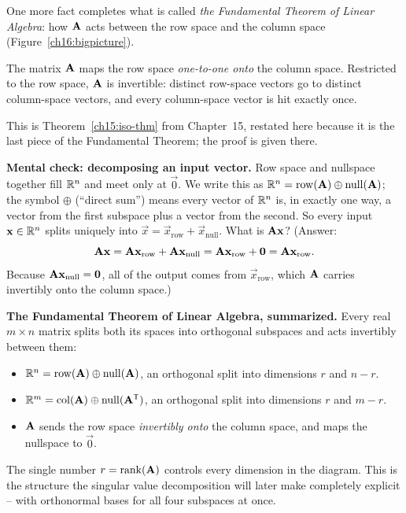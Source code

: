 One more fact completes what is called \emph{the Fundamental Theorem of Linear
Algebra}: how $\mathbf{A}$ acts between the row space and the column space
(Figure~\ref{ch16:bigpicture}).

\begin{theorem}\label{ch16:rowspace-iso}
The matrix $\mathbf{A}$ maps the row space \emph{one-to-one onto} the column space.
Restricted to the row space, $\mathbf{A}$ is invertible: distinct row-space vectors
go to distinct column-space vectors, and every column-space vector is hit exactly
once.
\end{theorem}

This is Theorem~\ref{ch15:iso-thm} from Chapter~15, restated here because it is
the last piece of the Fundamental Theorem; the proof is given there.

\begin{labbox}
\textbf{Mental check: decomposing an input vector.}
Row space and nullspace together fill $\mathbb{R}^n$ and meet only at $\vec{0}$. We write
this as $\mathbb{R}^n = \operatorname{row}(\mathbf{A}) \oplus \operatorname{null}(\mathbf{A})$; the symbol $\oplus$
(``direct sum'') means every vector of $\mathbb{R}^n$ is, in exactly one way, a vector
from the first subspace plus a vector from the second. So every input
$\mathbf{x}\in\mathbb{R}^n$ splits uniquely into $\vec{x} = \vec{x}_{\text{row}} + \vec{x}_{\text{null}}$.
What is $\mathbf{A}\mathbf{x}$?
(Answer:
\[
  \mathbf{A}\mathbf{x} = \mathbf{A}\mathbf{x}_{\text{row}} + \mathbf{A}\mathbf{x}_{\text{null}}
  = \mathbf{A}\mathbf{x}_{\text{row}} + \mathbf{0} = \mathbf{A}\mathbf{x}_{\text{row}}.
\]
Because
$\mathbf{A}\mathbf{x}_{\text{null}} = \mathbf{0}$, all of the output comes from
$\vec{x}_{\text{row}}$, which $\mathbf{A}$ carries invertibly onto the column space.)
\end{labbox}

\begin{focusbox}
\textbf{The Fundamental Theorem of Linear Algebra, summarized.} Every real
$m\times n$ matrix splits both its spaces into orthogonal subspaces and acts
invertibly between them:
\begin{itemize}
  \item $\mathbb{R}^n = \operatorname{row}(\mathbf{A}) \oplus \operatorname{null}(\mathbf{A})$, an orthogonal split into
        dimensions $r$ and $n-r$.
  \item $\mathbb{R}^m = \operatorname{col}(\mathbf{A}) \oplus \operatorname{null}(\mathbf{A}^{\mathsf{T}})$, an orthogonal split into
        dimensions $r$ and $m-r$.
  \item $\mathbf{A}$ sends the row space \emph{invertibly onto} the column space, and
        maps the nullspace to $\vec0$.
\end{itemize}
The single number $r=\operatorname{rank}(\mathbf{A})$ controls every dimension in the diagram. This
is the structure the singular value decomposition will later make completely
explicit -- with orthonormal bases for all four subspaces at once.
\end{focusbox}

